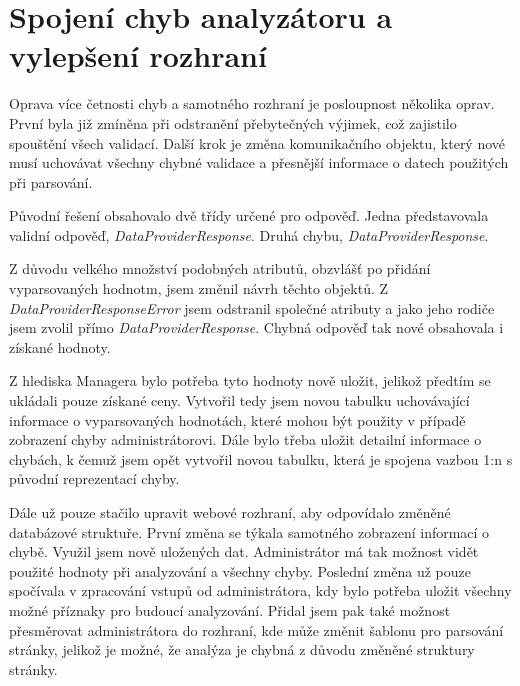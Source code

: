 \documentclass[thesis=B,czech]{FITthesis}[2012/06/26]
\begin{document}
\section{Spojení chyb analyzátoru a vylepšení rozhraní}
Oprava více četnosti chyb a samotného rozhraní je posloupnost několika oprav. První byla již zmíněna při odstranění přebytečných výjimek, což zajistilo spouštění
všech validací. Další krok je změna komunikačního objektu, který nové musí uchovávat všechny chybné validace a přesnější informace
o datech použitých při parsování.
\par
Původní řešení obsahovalo dvě třídy určené pro odpověď. Jedna představovala validní odpověď, \textit{DataProviderResponse}.
Druhá chybu, \textit{DataProviderResponse}.
\par
Z důvodu velkého množství podobných atributů, obzvlášť po přidání vyparsovaných hodnotm, jsem změnil návrh těchto objektů.
Z \textit{DataProviderResponseError} jsem odstranil společné atributy a jako jeho rodiče jsem zvolil přímo \textit{DataProviderResponse}.
Chybná odpověď tak nové obsahovala i získané hodnoty. 
\par
Z hlediska Managera bylo potřeba tyto hodnoty nově uložit, jelikož předtím se ukládali pouze získané ceny. Vytvořil tedy jsem novou tabulku
uchovávající informace o vyparsovaných hodnotách, které mohou být použity v případě zobrazení chyby administrátorovi.
Dále bylo třeba uložit detailní informace o chybách, k čemuž jsem opět vytvořil novou tabulku, která je spojena vazbou 1:n s původní
reprezentací chyby.
\par
Dále už pouze stačilo upravit webové rozhraní, aby odpovídalo změněné databázové struktuře. První změna se týkala samotného zobrazení
informací o chybě. Využil jsem nově uložených dat. Administrátor má tak možnost vidět použité hodnoty při analyzování a všechny chyby.
Poslední změna už pouze spočívala v zpracování vstupů od administrátora, kdy bylo potřeba uložit všechny možné příznaky pro 
budoucí analyzování. Přidal jsem pak také možnost přesměrovat administrátora do rozhraní, kde může změnit šablonu pro parsování
stránky, jelikož je možné, že analýza je chybná z důvodu změněné struktury stránky.
\end{document}
